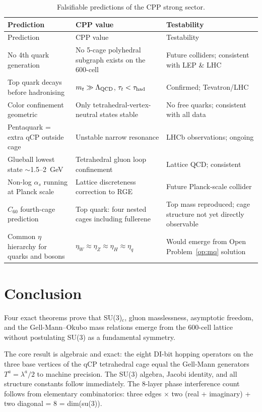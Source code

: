 \documentclass[11pt,a4paper]{article}
\newcommand{\as}{\alpha_s}
\begin{document}
\begin{longtable}{@{}p{5.2cm}p{4cm}p{3.5cm}@{}}
\caption{Falsifiable predictions of the CPP strong sector.}
\label{tab:predictions}\\
\toprule
Prediction & CPP value & Testability \\
\midrule
\endfirsthead
\toprule
Prediction & CPP value & Testability \\
\midrule
\endhead
\bottomrule
\endfoot
No 4th quark generation
  & No 5-cage polyhedral subgraph exists on the 600-cell
  & Future colliders; consistent with LEP \& LHC \\[4pt]
Top quark decays before hadronising
  & $m_t \gg \Lambda_{\rm QCD}$, $\tau_t < \tau_{\rm had}$
  & Confirmed; Tevatron/LHC \\[4pt]
Color confinement geometric
  & Only tetrahedral-vertex-neutral states stable
  & No free quarks; consistent with all data \\[4pt]
Pentaquark = extra qCP outside cage
  & Unstable narrow resonance
  & LHCb observations; ongoing \\[4pt]
Glueball lowest state $\sim$1.5--2~GeV
  & Tetrahedral gluon loop confinement
  & Lattice QCD; consistent \\[4pt]
Non-log $\as$ running at Planck scale
  & Lattice discreteness correction to RGE
  & Future Planck-scale collider \\[4pt]
$C_{60}$ fourth-cage prediction
  & Top quark: four nested cages including fullerene
  & Top mass reproduced; cage structure not yet directly observable \\[4pt]
Common $\eta$ hierarchy for quarks and bosons
  & $\eta_W \approx \eta_Z \approx \eta_H \approx \eta_q$
  & Would emerge from Open Problem~\ref{op:mq} solution \\
\end{longtable}

\section{Conclusion}
\label{sec:conclusion}

Four exact theorems prove that SU(3)$_c$, gluon masslessness,
asymptotic freedom, and the Gell-Mann--Okubo mass relations emerge
from the 600-cell lattice without postulating SU(3) as a fundamental
symmetry.

The core result is algebraic and exact: the eight DI-bit hopping
operators on the three base vertices of the qCP tetrahedral cage
equal the Gell-Mann generators $T^a = \lambda^a/2$ to machine
precision.  The SU(3) algebra, Jacobi identity, and all structure
constants follow immediately.  The 8-layer phase interference count
follows from elementary combinatorics: three edges $\times$ two
(real + imaginary) + two diagonal = 8 = dim(su(3)).
\end{document}
